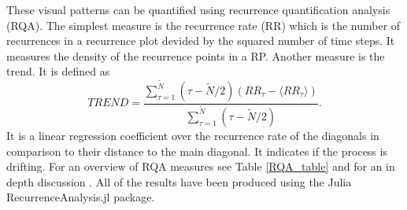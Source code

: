 \documentclass{article}
\begin{document}
These visual patterns can be quantified using recurrence quantification analysis (RQA)\cite{Zbilut}.
The simplest measure is the recurrence rate (RR) which is the number of recurrences in a recurrence plot devided by the squared number of time steps.
It measures the density of the recurrence points in a RP.
Another measure is the trend.
It is defined as
$$ TREND= \frac{\sum_{\tau=1}^{\tilde{N}}(\tau - \tilde{N}/2)(RR_\tau - \langle RR_\tau \rangle)}{\sum_{\tau=1}^{\tilde{N}}(\tau - \tilde{N}/2)}.$$
It is a linear regression coefficient over the recurrence rate of the diagonals in comparison to their distance to the main diagonal.
It indicates if the process is drifting.
For an overview of RQA measures see  Table \ref{RQA_table} and for an in depth discussion \cite{Marwan06}.
All of the results have been produced using the Julia RecurrenceAnalysis.jl package\cite{RQA.jl}.
\end{document}
